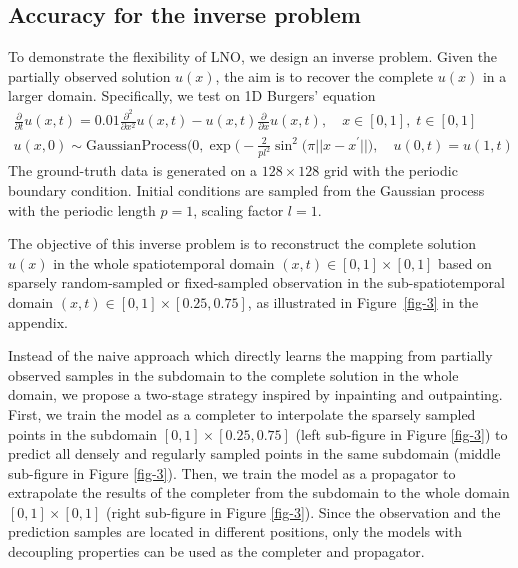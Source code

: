 \documentclass{article}
\begin{document}
\subsection{Accuracy for the inverse problem}
\label{inverse-exp}
To demonstrate the flexibility of LNO, we design an inverse problem. Given the partially observed solution $u(x)$, the aim is to recover the complete $u(x)$ in a larger domain. 
Specifically, we test on  1D Burgers' equation
\begin{gather*} 
\tfrac{\partial }{\partial t}u(x,t) = 0.01\tfrac{\partial^2 }{\partial x^2} u(x,t)-u(x,t)\tfrac{\partial }{\partial x} u(x,t), \quad x\in[0,1],\; t\in[0,1] \\
u(x,0)\sim \text{GaussianProcess}(0, \exp\big(-\tfrac{2}{pl^2}\sin^2(\pi ||x-x^{'}||\big), \quad u(0, t)=u(1, t)
\end{gather*}
The ground-truth data is generated on a $128\times128$ grid with the periodic boundary condition. Initial conditions are sampled from the Gaussian process with the periodic length $p=1$, scaling factor $l=1$. 

The objective of this inverse problem is to reconstruct the complete solution $u(x)$  in the whole spatiotemporal domain $(x,t)\in[0,1]\times[0,1]$ based on sparsely random-sampled or fixed-sampled observation in the sub-spatiotemporal domain $(x,t)\in[0,1]\times[0.25,0.75]$, as illustrated in Figure~\ref{fig-3} in the appendix. 

Instead of the naive approach which directly learns the mapping from partially observed samples in the subdomain to the complete solution in the whole domain, we propose a two-stage strategy inspired by inpainting\cite{inpainting1,inpainting2} and outpainting\cite{outpainting1,outpainting2}. First, we train the model as a completer to interpolate the sparsely sampled points in the subdomain $[0,1]\times[0.25,0.75]$ (left sub-figure in Figure \ref{fig-3}) to predict all densely and regularly sampled points in the same subdomain (middle sub-figure in Figure \ref{fig-3}). Then, we train the model as a propagator to extrapolate the results of the completer from the subdomain to the whole domain $[0,1]\times[0,1]$ (right sub-figure in Figure \ref{fig-3}). Since the observation and the prediction samples are located in different positions, only the models with decoupling properties can be used as the completer and propagator. 
\end{document}
